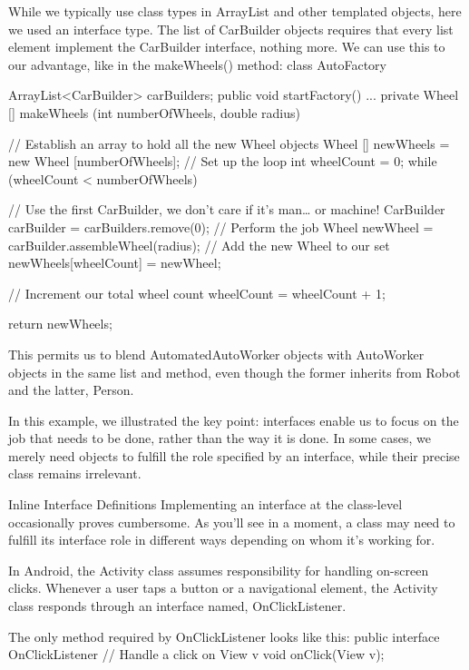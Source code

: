         While we typically use class types in ArrayList and other templated objects, here we used an interface type. The list of CarBuilder objects requires that every list element implement the CarBuilder interface, nothing more. We can use this to our advantage, like in the makeWheels() method:
            class AutoFactory {
                ArrayList<CarBuilder> carBuilders;
                public void startFactory() {
                    ...
                }
                private Wheel [] makeWheels (int numberOfWheels, double radius) {
                    // Establish an array to hold all the new Wheel objects
                    Wheel [] newWheels = new Wheel [numberOfWheels];
                    // Set up the loop
                    int wheelCount = 0;
                    while (wheelCount < numberOfWheels) {
                        // Use the first CarBuilder, we don't care if it's man… or machine!
                        CarBuilder carBuilder = carBuilders.remove(0);
                        // Perform the job
                        Wheel newWheel = carBuilder.assembleWheel(radius);
                        // Add the new Wheel to our set
                        newWheels[wheelCount] = newWheel;
            
                        // Increment our total wheel count
                        wheelCount = wheelCount + 1;
                    }
                    return newWheels;
                }
        This permits us to blend AutomatedAutoWorker objects with AutoWorker objects in the same list and method, even though the former inherits from Robot and the latter, Person.

        In this example, we illustrated the key point: interfaces enable us to focus on the job that needs to be done, rather than the way it is done. In some cases, we merely need objects to fulfill the role specified by an interface, while their precise class remains irrelevant.

    Inline Interface Definitions
        Implementing an interface at the class-level occasionally proves cumbersome. As you’ll see in a moment, a class may need to fulfill its interface role in different ways depending on whom it’s working for.

        In Android, the Activity class assumes responsibility for handling on-screen clicks. Whenever a user taps a button or a navigational element, the Activity class responds through an interface named, OnClickListener.

        The only method required by OnClickListener looks like this:
            public interface OnClickListener {
                // Handle a click on View v
                void onClick(View v);
            }

}
